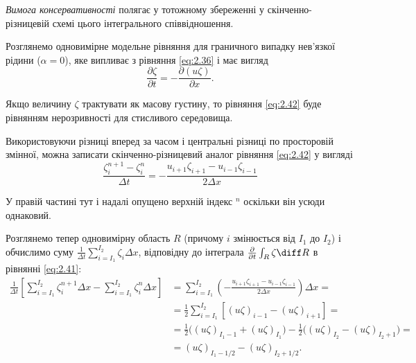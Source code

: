 \begin{definition}
    \textit{Вимога консервативності} полягає у тотожному збереженні у скінченно-різницевій схемі цього інтегрального співвідношення.
\end{definition}

Розглянемо одновимірне модельне рівняння для граничного випадку нев'язкої рідини ($\alpha = 0$), яке випливає з рівняння \eqref{eq:2.36} і має вигляд
\begin{equation}
    \label{eq:2.42}
    \frac{\partial \zeta}{\partial t} = - \frac{\partial (u \zeta)}{\partial x}.
\end{equation}

\begin{remark}
    Якщо величину $\zeta$ трактувати як масову густину, то рівняння \eqref{eq:2.42} буде рівнянням нерозривності для стисливого середовища.
\end{remark}

Використовуючи різниці вперед за часом і центральні різниці по просторовій змінної, можна записати скінченно-різницевий аналог рівняння \eqref{eq:2.42} у вигляді
\begin{equation*}
    \frac{\zeta_i^{n + 1} - \zeta_i^n}{\Delta t} = - \frac{u_{i + 1} \zeta_{i + 1} - u_{i - 1} \zeta_{i - 1}}{2 \Delta x}
\end{equation*}

\begin{remark}
    У правій частині тут і надалі опущено верхній індекс ${}^n$ оскільки він усюди однаковий.
\end{remark}

Розглянемо тепер одновимірну область $R$ (причому $i$ змінюється від $I_1$ до $I_2$) і обчислимо суму $\frac{1}{\Delta t} \sum_{i = I_1}^{I_2} \zeta_i \Delta x$, відповідну до інтеграла $\frac{\partial}{\partial t} \int_R \zeta \diff R$ в рівнянні \eqref{eq:2.41}:
\begin{align}
    \frac{1}{\Delta t} \left[ \sum_{i = I_1}^{I_2} \zeta_i^{n + 1} \Delta x - \sum_{i = I_1}^{I_2} \zeta_i^n \Delta x \right] &= \sum_{i = I_1}^{I_2} \left( - \frac{u_{i + 1} \zeta_{i + 1} - u_{i - 1} \zeta_{i - 1}}{2 \Delta x} \right) \Delta x = \nonumber \\
    \label{eq:2.43}
    &= \frac{1}{2} \sum_{i = I_1}^{I_2} [(u \zeta)_{i - 1} - (u \zeta)_{i + 1}] = \\
    &= \frac{1}{2} \Big( (u\zeta)_{I_1 - 1} + (u\zeta)_{I_1} \Big) - \frac{1}{2} \Big( (u\zeta)_{I_2} - (u\zeta)_{I_2 + 1} \Big) = \nonumber \\
    \label{eq:2.44}
    &= (u \zeta)_{I_1 - 1/2} - (u \zeta)_{I_2 + 1/2}.
\end{align}

